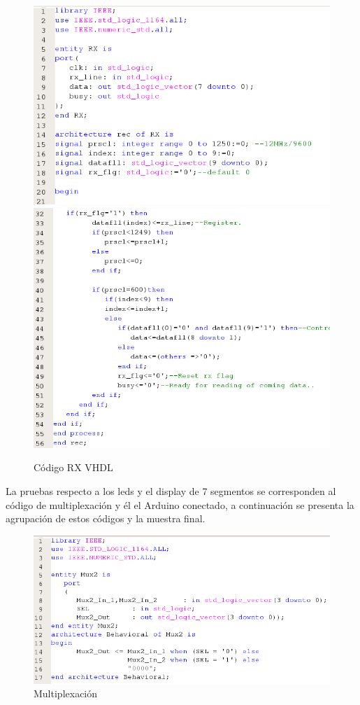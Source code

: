 \documentclass[journal]{IEEEtran}
\begin{document}
\begin{figure}[H]
    \centering
    \includegraphics[scale=0.4]{images/rx1.png}
    \includegraphics[scale=0.4]{images/rx2.png}
    \caption{Código RX VHDL}
\end{figure}

La pruebas respecto a los leds y el display de 7 segmentos se corresponden al código de multiplexación y él el Arduino conectado, a continuación se presenta la agrupación de estos códigos y la muestra final.

\begin{figure}[H]
    \centering
    \includegraphics[scale=0.4]{images/mutiplexer.png}
    \caption{Multiplexación}
\end{figure}
\end{document}
